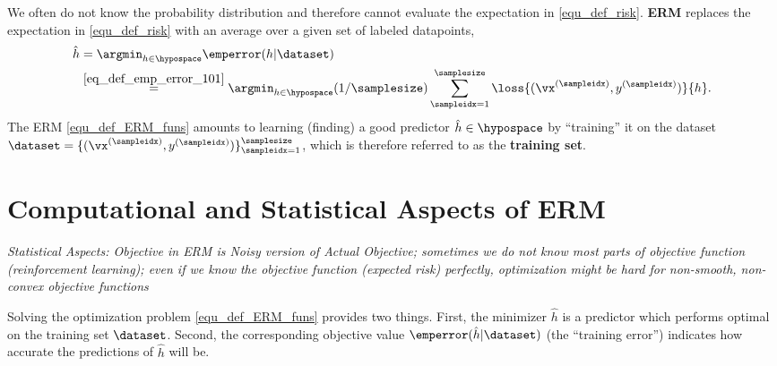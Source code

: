 \documentclass[12pt]{report}
\begin{document}
We often do not know the probability distribution and therefore 
cannot evaluate the expectation in \eqref{equ_def_risk}. 
 {\bf ERM} replaces the expectation in  \eqref{equ_def_risk} with an average 
 over a given set of labeled datapoints,  
\begin{align}
\label{equ_def_ERM_funs}
   \hat{h} & = \argmin_{h \in \hypospace} \emperror(h|\dataset) \nonumber \\ 
   & \stackrel{\eqref{eq_def_emp_error_101}}{=}  \argmin_{h \in \hypospace} (1/\samplesize) \sum_{\sampleidx=1}^{\samplesize} \loss{(\vx^{(\sampleidx)},y^{(\sampleidx)})}{h}.
\end{align}
The ERM \eqref{equ_def_ERM_funs} amounts to learning (finding) a 
good predictor $\hat{h} \in \hypospace$ by ``training'' it on the 
dataset $\dataset = \{ (\vx^{(\sampleidx)},y^{(\sampleidx)}) \}_{\sampleidx=1}^{\samplesize}$, 
which is therefore referred to as the {\bf training set}. 

\section{Computational and Statistical Aspects of ERM}
\label{sec_comp_stat_ERM}

\emph{Statistical Aspects: Objective in ERM is Noisy version of Actual Objective; sometimes we do 
not know most parts of objective function (reinforcement learning); even if we know 
the objective function (expected risk) perfectly, optimization might be hard for non-smooth, 
non-convex objective functions}

Solving the optimization problem \eqref{equ_def_ERM_funs} provides 
two things. First, the minimizer $\hat{h}$ is a predictor which performs 
optimal on the training set $\dataset$. Second, the corresponding 
objective value $\emperror(\hat{h}|\dataset)$ (the ``training error'') 
indicates how accurate the predictions of $\hat{h}$ will be. 
\end{document}
